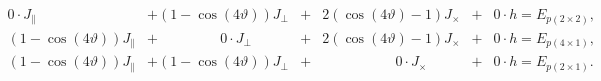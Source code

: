 	\begin{equation}
	\begin{split}
		0\cdot J_\parallel&+ \left(1-\cos(4\vartheta)\right)J_\perp&+&2\left(\cos(4\vartheta) - 1\right)J_\times&+&0\cdot h= E_{p(2\times2)}, \\
		\left(1-\cos(4\vartheta) \right) J_\parallel&+ \qquad \qquad ~~ 0\cdot  J_\perp&+&2\left(\cos(4\vartheta)-1 \right)J_\times&+&0\cdot h= E_{p(4\times1)}, \\
		\left(1-\cos(4\vartheta) \right)J_\parallel
		&+\left(1 - \cos\left(4\vartheta \right)\right) J_\perp&+& \qquad \qquad \quad ~ 0\cdot J_\times&
		+&0\cdot h
		=E_{p(2\times1)}.
	\end{split}
\end{equation}

